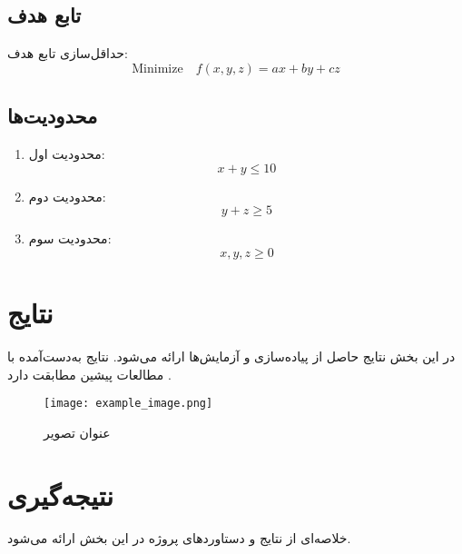 \subsection*{تابع هدف}
حداقل‌سازی تابع هدف:
\[
\text{Minimize} \quad f(x,y,z) = ax + by + cz
\]

\subsection*{محدودیت‌ها}
\begin{enumerate}
    \item محدودیت اول:
    \[
    x + y \leq 10
    \]
    \item محدودیت دوم:
    \[
    y + z \geq 5
    \]
    \item محدودیت سوم:
    \[
    x, y, z \geq 0
    \]
\end{enumerate}

\section{نتایج}
در این بخش نتایج حاصل از پیاده‌سازی و آزمایش‌ها ارائه می‌شود. نتایج به‌دست‌آمده با مطالعات پیشین مطابقت دارد \cite{ref-1}.

\begin{figure}[h]
    \centering
    \texttt{[image: example\_image.png]}
    \caption{عنوان تصویر}
    \label{fig:example}
\end{figure}

\section{نتیجه‌گیری}
خلاصه‌ای از نتایج و دستاورد‌های پروژه در این بخش ارائه می‌شود.
